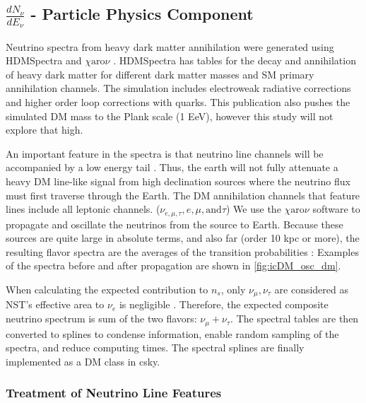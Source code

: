 \subsection{$\frac{dN_\nu}{dE_\nu}$ - Particle Physics Component}\label{sec:icDM_particlephysics}

Neutrino spectra from heavy dark matter annihilation were generated using HDMSpectra \cite{HDMSpectra} and $\chi \textrm{aro}\nu$ \cite{Charon}.
HDMSpectra has tables for the decay and annihilation of heavy dark matter for different dark matter masses and SM primary annihilation channels.
The simulation includes electroweak radiative corrections and higher order loop corrections with quarks.
This publication also pushes the simulated DM mass to the Plank scale (1 EeV), however this study will not explore that high.

An important feature in the spectra is that neutrino line channels will be accompanied by a low energy tail \cite{HDMSpectra}.
Thus, the earth will not fully attenuate a heavy DM line-like signal from high declination sources where the neutrino flux must first traverse through the Earth.
The DM annihilation channels that feature lines include all leptonic channels. ($\nu_{e,\mu,\tau}, e, \mu, \mathrm{and} \tau$)
We use the \href{https://iopscience.iop.org/article/10.1088/1475-7516/2020/10/043}{ $\chi \mathrm{aro}\nu$} software to propagate and oscillate the neutrinos from the source to Earth.
Because these sources are quite large in absolute terms, and also far (order 10 kpc or more), the resulting flavor spectra are the averages of the transition probabilities \cite{Charon}:
\nuOscMatrix
Examples of the spectra before and after propagation are shown in \cref{fig:icDM_osc_dm}.

When calculating the expected contribution to $n_s$, only $ \nu_\mu, \nu_\tau $ are considered as NST's effective area to $ \nu_e $ is negligible \cite{IC3_thesis_Cerver}.
Therefore, the expected composite neutrino spectrum is sum of the two flavors: $\nu_\mu + \nu_\tau$.
The spectral tables are then converted to splines to condense information, enable random sampling of the spectra, and reduce computing times.
The spectral splines are finally implemented as a DM class in csky.


\subsubsection{Treatment of Neutrino Line Features}\label{sec:icDM_nu_lines}

